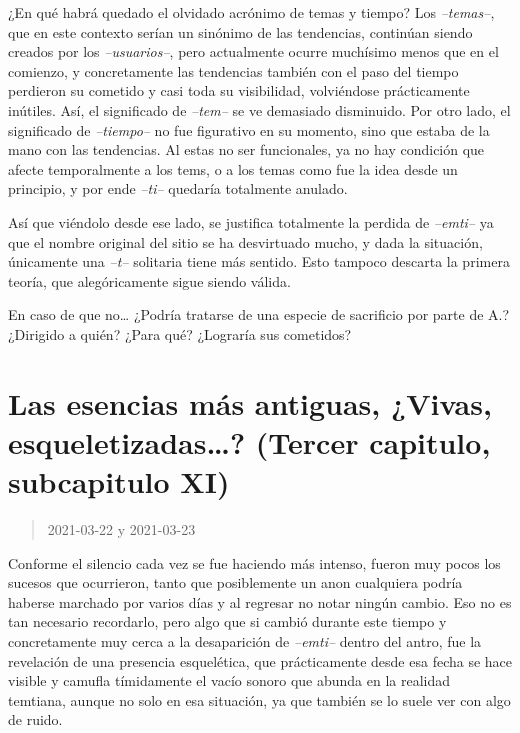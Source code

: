 \documentclass[
  spanish,
]{book}
\begin{document}
¿En qué habrá quedado el olvidado acrónimo de temas y tiempo?
Los \emph{--temas--}, que en este contexto serían un sinónimo de las tendencias, continúan siendo creados por los \emph{--usuarios--}, pero actualmente ocurre muchísimo menos que en el comienzo, y concretamente las tendencias también con el paso del tiempo perdieron su cometido y casi toda su visibilidad, volviéndose prácticamente inútiles. Así, el significado de \emph{--tem--} se ve demasiado disminuido.
Por otro lado, el significado de \emph{--tiempo--} no fue figurativo en su momento, sino que estaba de la mano con las tendencias. Al estas no ser funcionales, ya no hay condición que afecte temporalmente a los tems, o a los temas como fue la idea desde un principio, y por ende \emph{--ti--} quedaría totalmente anulado.

Así que viéndolo desde ese lado, se justifica totalmente la perdida de \emph{--emti--} ya que el nombre original del sitio se ha desvirtuado mucho, y dada la situación, únicamente una \emph{--t--} solitaria tiene más sentido. Esto tampoco descarta la primera teoría, que alegóricamente sigue siendo válida.

En caso de que no\ldots{} ¿Podría tratarse de una especie de sacrificio por parte de A.? ¿Dirigido a quién? ¿Para qué? ¿Lograría sus cometidos?

\hypertarget{las-esencias-muxe1s-antiguas-vivas-esqueletizadas-tercer-capitulo-subcapitulo-xi}{%
\section{Las esencias más antiguas, ¿Vivas, esqueletizadas\ldots? (Tercer capitulo, subcapitulo XI)}\label{las-esencias-muxe1s-antiguas-vivas-esqueletizadas-tercer-capitulo-subcapitulo-xi}}

\begin{quote}
2021-03-22 y 2021-03-23
\end{quote}

Conforme el silencio cada vez se fue haciendo más intenso, fueron muy pocos los sucesos que ocurrieron, tanto que posiblemente un anon cualquiera podría haberse marchado por varios días y al regresar no notar ningún cambio. Eso no es tan necesario recordarlo, pero algo que si cambió durante este tiempo y concretamente muy cerca a la desaparición de \emph{--emti--} dentro del antro, fue la revelación de una presencia esquelética, que prácticamente desde esa fecha se hace visible y camufla tímidamente el vacío sonoro que abunda en la realidad temtiana, aunque no solo en esa situación, ya que también se lo suele ver con algo de ruido.
\end{document}
